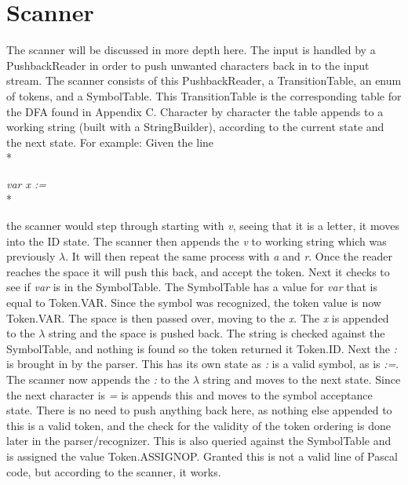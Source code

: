 \documentclass[12pt]{scrreprt}
\begin{document}
\chapter{Scanner}
The scanner will be discussed in more depth here. The input is handled by a PushbackReader 
in order to push unwanted characters back in to the input stream. The scanner consists of 
this PushbackReader, a TransitionTable, an enum of tokens, and a SymbolTable. This 
TransitionTable is the corresponding table for the DFA found in Appendix C. Character by 
character the table appends to a working string (built with a StringBuilder), according to 
the current state and the next state. For example:
Given the line\\* 
\begin{center}
\textit{var x :=}\\*
\end{center}
the scanner would step through starting with \textit{v}, seeing that it is a letter, it 
moves into the ID state. The scanner then appends the \textit{v} to working string which 
was previously $\lambda$. It will then repeat the same process with \textit{a} and 
\textit{r}. Once the reader reaches the space it will push this back, and accept the token.
 Next it checks to see if \textit{var} is in the SymbolTable. The SymbolTable has a value 
for \textit{var} that is equal to Token.VAR. Since the symbol was recognized, the token 
value is now Token.VAR. The space is then passed over, moving to the \textit{x}. The 
\textit{x} is appended to the $\lambda$ string and the space is pushed back. The string is 
checked against the SymbolTable, and nothing is found so the token returned it Token.ID. 
Next the \textit{:} is brought in by the parser. This has its own state as \textit{:} is a 
valid symbol, as is \textit{:=}. The scanner now appends the \textit{:} to the $\lambda$ 
string and moves to the next state. Since the next character is \textit{=} is appends this 
and moves to the symbol acceptance state. There is no need to push anything back here, as 
nothing else appended to this is a valid token, and the check for the validity of the token
 ordering is done later in the parser/recognizer. This is also queried against the 
 SymbolTable and is assigned the value Token.ASSIGNOP. Granted this is not a valid line of 
 Pascal code, but according to the scanner, it works.
\end{document}
